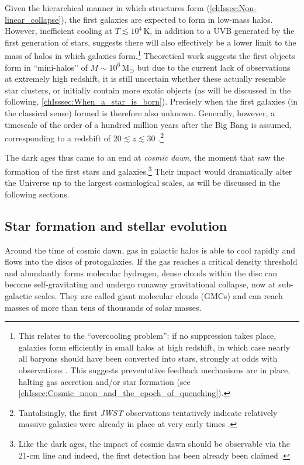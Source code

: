 Given the hierarchical manner in which structures form (\cref{chIssec:Non-linear_collapse}), the first galaxies are expected to form in low-mass halos. However, inefficient cooling at $T \lesssim 10^4 \, \mathrm{K}$, in addition to a UVB generated by the first generation of stars, suggests there will also effectively be a lower limit to the mass of halos in which galaxies form.\footnote{This relates to the ``overcooling problem'': if no suppression takes place, galaxies form efficiently in small halos at high redshift, in which case nearly all baryons should have been converted into stars, strongly at odds with observations \citep{1978MNRAS.183..341W}. This suggests preventative feedback mechanisms are in place, halting gas accretion and/or star formation (see \cref{chIssec:Cosmic_noon_and_the_epoch_of_quenching}).} Theoretical work suggests the first objects form in ``mini-halos'' of $M \sim 10^6 \, \mathrm{M_\odot}$ \citep{2013RPPh...76k2901B} but due to the current lack of observations at extremely high redshift, it is still uncertain whether these actually resemble star clusters, or initially contain more exotic objects (as will be discussed in the following, \cref{chIsssec:When_a_star_is_born}). Precisely when the first galaxies (in the classical sense) formed is therefore also unknown. Generally, however, a timescale of the order of a hundred million years after the Big Bang is assumed, corresponding to a redshift of $20 \lesssim z \lesssim 30$ \citep[e.g.][]{2016ARA&A..54..761S}.\footnote{Tantalisingly, the first \textit{JWST} observations tentatively indicate relatively massive galaxies were already in place at very early times \citep{2022arXiv220712446L}.}

The dark ages thus came to an end at \textit{cosmic dawn}, the moment that saw the formation of the first stars and galaxies.\footnote{Like the dark ages, the impact of cosmic dawn should be observable via the 21-cm line and indeed, the first detection has been already been claimed \citep{2018Natur.555...67B}.} Their impact would dramatically alter the Universe up to the largest cosmological scales, as will be discussed in the following sections.

\subsection{Star formation and stellar evolution}
\label{chIssec:Star_formation_and_stellar_evolution}

Around the time of cosmic dawn, gas in galactic halos is able to cool rapidly and flows into the discs of protogalaxies. If the gas reaches a critical density threshold and abundantly forms molecular hydrogen, dense clouds within the disc can become self-gravitating and undergo runaway gravitational collapse, now at sub-galactic scales. They are called giant molecular clouds (GMCs) and can reach masses of more than tens of thousands of solar masses.

